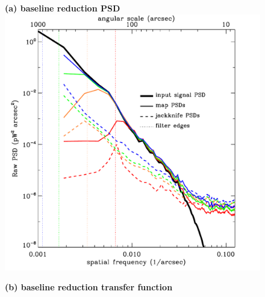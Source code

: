\documentclass[useAMS,usenatbib,nofootinbib]{mn2e}
\begin{document}
\begin{figure}
\centering
\begin{minipage}[h]{0.495\linewidth}
\textbf{(a) baseline reduction PSD} \\

\includegraphics[width=\linewidth]{pspec_m17_default}
\end{minipage}
\begin{minipage}[h]{0.495\linewidth}
\textbf{(b) baseline reduction transfer function} \\


\end{minipage}
\end{figure}
\end{document}
